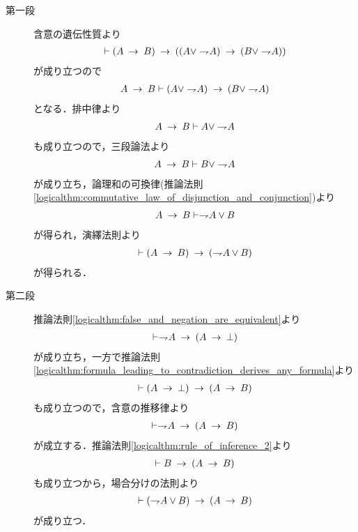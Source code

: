 	\begin{prf}\mbox{}
		\begin{description}
			\item[第一段]
				含意の遺伝性質より
				\begin{align}
					\vdash (A \rarrow B) \rarrow 
					((A \vee \negation A) \rarrow (B \vee \negation A))
				\end{align}
				が成り立つので
				\begin{align}
					A \rarrow B \vdash (A \vee \negation A) \rarrow (B \vee \negation A)
				\end{align}
				となる．排中律より
				\begin{align}
					A \rarrow B \vdash A \vee \negation A
				\end{align}
				も成り立つので，三段論法より
				\begin{align}
					A \rarrow B \vdash B \vee \negation A
				\end{align}
				が成り立ち，論理和の可換律(推論法則\ref{logicalthm:commutative_law_of_disjunction_and_conjunction})より
				\begin{align}
					A \rarrow B \vdash \negation A \vee B
				\end{align}
				が得られ，演繹法則より
				\begin{align}
					\vdash (A \rarrow B) \rarrow (\negation A \vee B)
				\end{align}
				が得られる．
				
			\item[第二段]
				推論法則\ref{logicalthm:false_and_negation_are_equivalent}より
				\begin{align}
					\vdash \negation A \rarrow (A \rarrow \bot)
				\end{align}
				が成り立ち，一方で推論法則\ref{logicalthm:formula_leading_to_contradiction_derives_any_formula}より
				\begin{align}
					\vdash (A \rarrow \bot) \rarrow (A \rarrow B)
				\end{align}
				も成り立つので，含意の推移律より
				\begin{align}
					\vdash \negation A \rarrow (A \rarrow B)
				\end{align}
				が成立する．推論法則\ref{logicalthm:rule_of_inference_2}より
				\begin{align}
					\vdash B \rarrow (A \rarrow B)
				\end{align}
				も成り立つから，場合分けの法則より
				\begin{align}
					\vdash (\negation A \vee B) \rarrow (A \rarrow B)
				\end{align}
				が成り立つ．
				\QED
		\end{description}
	\end{prf}
	
